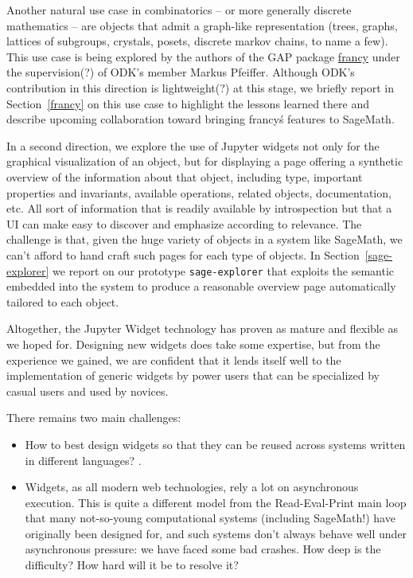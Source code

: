 \documentclass{deliverablereport}
\begin{document}

Another natural use case in combinatorics -- or more generally
discrete mathematics -- are objects that admit a graph-like
representation (trees, graphs, lattices of subgroups, crystals,
posets, discrete markov chains, to name a few). This use case is being
explored by the authors of the GAP package
\href{https://github.com/mcmartins/francy}{francy} under the
supervision(?) of ODK's member Markus Pfeiffer. Although ODK's
contribution in this direction is lightweight(?) at this stage, we
briefly report in Section~\ref{francy} on this use case to highlight
the lessons learned there and describe upcoming collaboration toward
bringing francy\'s features to SageMath.

In a second direction, we explore the use of Jupyter widgets not only
for the graphical visualization of an object, but for displaying a
page offering a synthetic overview of the information about that
object, including type, important properties and invariants, available
operations, related objects, documentation, etc. All sort of
information that is readily available by introspection but that a UI
can make easy to discover and emphasize according to relevance. The
challenge is that, given the huge variety of objects in a system like
SageMath, we can't afford to hand craft such pages for each type of
objects. In Section~\ref{sage-explorer} we report on our prototype
\lstinline{sage-explorer} that exploits the semantic embedded into the
system to produce a reasonable overview page automatically tailored to
each object.



Altogether, the Jupyter Widget technology has proven as mature and
flexible as we hoped for. Designing new widgets does take some
expertise, but from the experience we gained, we are confident that it
lends itself well to the implementation of generic widgets by power
users that can be specialized by casual users and used by novices.

There remains two main challenges:
\begin{itemize}
\item How to best design widgets so that they can be reused across
  systems written in different languages? . 
\item Widgets, as all modern web technologies, rely a lot on
  asynchronous execution. This is quite a different model from the
  Read-Eval-Print main loop that many not-so-young computational
  systems (including SageMath!) have originally been designed for, and
  such systems don't always behave well under asynchronous pressure:
  we have faced some bad crashes. How deep is the difficulty? How hard
  will it be to resolve it?
\end{itemize}
\end{document}

